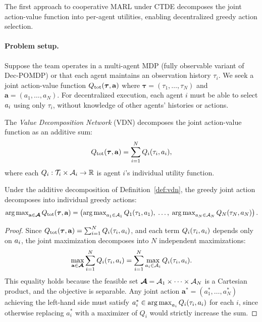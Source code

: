 \documentclass[11pt,a4paper]{article}
\begin{document}
The first approach to cooperative MARL under CTDE decomposes the
joint action-value function into per-agent utilities, enabling
decentralized greedy action selection.

\paragraph{Problem setup.}
Suppose the team operates in a multi-agent MDP (fully observable
variant of Dec-POMDP) or that each agent maintains an observation
history $\tau_i$.  We seek a joint action-value function
$Q_{\mathrm{tot}}(\boldsymbol{\tau}, \mathbf{a})$ where $\boldsymbol{\tau}
= (\tau_1, \ldots, \tau_N)$ and $\mathbf{a} = (a_1, \ldots, a_N)$.
For decentralized execution, each agent $i$ must be able to select
$a_i$ using only $\tau_i$, without knowledge of other agents'
histories or actions.

\begin{definition}
\label{def:vdn}
The \emph{Value Decomposition Network} (VDN) \citep{sunehag2018}
decomposes the joint action-value function as an additive sum:
\[
  Q_{\mathrm{tot}}(\boldsymbol{\tau}, \mathbf{a})
  = \sum_{i=1}^{N} Q_i(\tau_i, a_i),
\]
where each $Q_i : \mathcal{T}_i \times \mathcal{A}_i \to \mathbb{R}$ is
agent $i$'s individual utility function.
\end{definition}

\begin{theorem}
\label{thm:vdn-greedy}
Under the additive decomposition of Definition~\ref{def:vdn},
the greedy joint action decomposes into individual greedy actions:
\[
  \operatorname{arg\,max}_{\mathbf{a} \in \boldsymbol{\mathcal{A}}}
  Q_{\mathrm{tot}}(\boldsymbol{\tau}, \mathbf{a})
  = \left(
    \operatorname{arg\,max}_{a_1 \in \mathcal{A}_1} Q_1(\tau_1, a_1),\;
    \ldots,\;
    \operatorname{arg\,max}_{a_N \in \mathcal{A}_N} Q_N(\tau_N, a_N)
  \right).
\]
\end{theorem}

\begin{proof}
Since $Q_{\mathrm{tot}}(\boldsymbol{\tau}, \mathbf{a}) = \sum_{i=1}^N
Q_i(\tau_i, a_i)$, and each term $Q_i(\tau_i, a_i)$
depends only on $a_i$, the joint maximization decomposes
into $N$ independent maximizations:
\[
  \max_{\mathbf{a} \in \boldsymbol{\mathcal{A}}}
  \sum_{i=1}^N Q_i(\tau_i, a_i)
  = \sum_{i=1}^N \max_{a_i \in \mathcal{A}_i} Q_i(\tau_i, a_i).
\]
This equality holds because the feasible set $\boldsymbol{\mathcal{A}} =
\mathcal{A}_1 \times \cdots \times \mathcal{A}_N$ is a Cartesian product,
and the objective is separable.  Any joint action
$\mathbf{a}^* = (a_1^*, \ldots, a_N^*)$ achieving the left-hand
side must satisfy $a_i^* \in \operatorname{arg\,max}_{a_i} Q_i(\tau_i, a_i)$
for each $i$, since otherwise replacing $a_i^*$ with a maximizer
of $Q_i$ would strictly increase the sum.
\end{proof}
\end{document}
